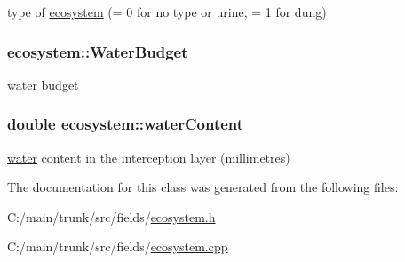 type of \hyperlink{classecosystem}{ecosystem} (= 0 for no type or urine, = 1 for dung) \hypertarget{classecosystem_a08137c3fd93a93cc284bf3e8ad217222}{
\subsubsection[{WaterBudget}]{ {\bf ecosystem::WaterBudget}}}
\label{classecosystem_a08137c3fd93a93cc284bf3e8ad217222}


\hyperlink{classwater}{water} \hyperlink{classbudget}{budget} \hypertarget{classecosystem_a34e09ac34adc98d3c5269845fdd23e4b}{
\subsubsection[{waterContent}]{\setlength{\rightskip}{0pt plus 5cm}double {\bf ecosystem::waterContent}}}
\label{classecosystem_a34e09ac34adc98d3c5269845fdd23e4b}


\hyperlink{classwater}{water} content in the interception layer (millimetres) 

The documentation for this class was generated from the following files:\begin{DoxyCompactItemize}
\item 
C:/main/trunk/src/fields/\hyperlink{ecosystem_8h}{ecosystem.h}\item 
C:/main/trunk/src/fields/\hyperlink{ecosystem_8cpp}{ecosystem.cpp}\end{DoxyCompactItemize}
